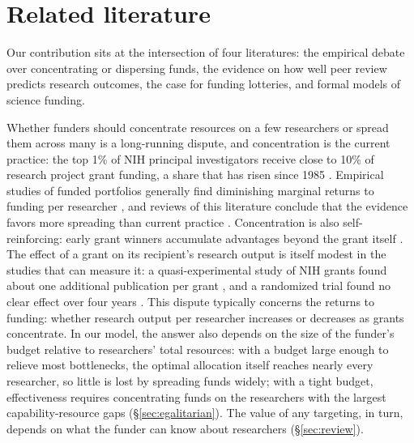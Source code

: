 \documentclass[article, 11pt, reqno]{amsart}
\theoremstyle{named}
\begin{document}
\section{Related literature}\label{sec:literature}

Our contribution sits at the intersection of four literatures: the empirical debate over concentrating or dispersing funds, the evidence on how well peer review predicts research outcomes, the case for funding lotteries, and formal models of science funding.

Whether funders should concentrate resources on a few researchers or spread them across many is a long-running dispute, and concentration is the current practice: the top 1\% of NIH principal investigators receive close to 10\% of research project grant funding, a share that has risen since 1985 \citep{KatzMatter2020, Lauer2021}. Empirical studies of funded portfolios generally find diminishing marginal returns to funding per researcher \citep{FortinCurrie2013}, and reviews of this literature conclude that the evidence favors more spreading than current practice \citep{Mongeon2016, Aagaard2020}. Concentration is also self-reinforcing: early grant winners accumulate advantages beyond the grant itself \citep{Merton1968, BolVaanRijt2018}. The effect of a grant on its recipient's research output is itself modest in the studies that can measure it: a quasi-experimental study of NIH grants found about one additional publication per grant \citep{JacobLefgren2011}, and a randomized trial found no clear effect over four years \citep{Barnett2024}. This dispute typically concerns the returns to funding: whether research output per researcher increases or decreases as grants concentrate. In our model, the answer also depends on the size of the funder's budget relative to researchers' total resources: with a budget large enough to relieve most bottlenecks, the optimal allocation itself reaches nearly every researcher, so little is lost by spreading funds widely; with a tight budget, effectiveness requires concentrating funds on the researchers with the largest capability-resource gaps (\S\ref{sec:egalitarian}). The value of any targeting, in turn, depends on what the funder can know about researchers (\S\ref{sec:review}).
\end{document}
